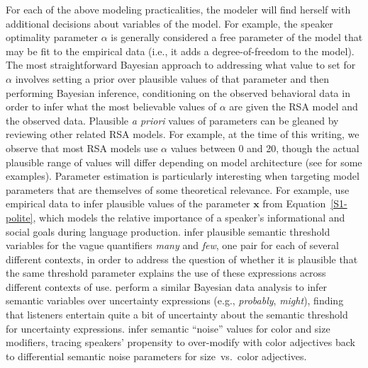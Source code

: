 \documentclass{sp}
\newcommand{\gcs}[1]{\textcolor{blue}{[gcs: #1]}}
\newcommand{\mf}[1]{\textcolor{orange}{[mf: #1]}}
\begin{document}
For each of the above modeling practicalities, the modeler will find herself with additional decisions about variables of the model. For example, the speaker optimality parameter $\alpha$ is generally considered a free parameter of the model that may be fit to the empirical data (i.e., it adds a degree-of-freedom to the model). The most straightforward Bayesian approach to addressing what value to set for $\alpha$ involves setting a prior over plausible values of that parameter and then performing Bayesian inference, conditioning on the observed behavioral data in order to infer what  the most believable values of $\alpha$ are given the RSA model and the observed data.
Plausible \emph{a priori} values of parameters can be gleaned by reviewing other related RSA models. For example, at the time of this writing, we observe that most RSA models use $\alpha$ values between 0 and 20, though the actual plausible range of values will differ depending on model architecture (see \citealp{tesslergoodman2019, yoonetal2020} for some examples).
Parameter estimation is particularly interesting when targeting model parameters that are themselves of some theoretical relevance.
For example, \citet{yoonetal2016} use empirical data to infer plausible values of the parameter $\textbf{x}$ from Equation~\eqref{S1-polite}, which models the relative importance of a speaker's informational and social goals during language production.
\citet{FrankeScholler2016:Semantic-values} infer plausible semantic threshold variables for the vague quantifiers \emph{many} and \emph{few}, one pair for each of several different contexts, in order to address the question of whether it is plausible that the same threshold parameter explains the use of these expressions across different contexts of use.
\citet{schuster2020know} perform a similar Bayesian data analysis to infer semantic variables over uncertainty expressions (e.g., \emph{probably}, \emph{might}), finding that listeners entertain quite a bit of uncertainty about the semantic threshold for uncertainty expressions. \citet{degenetal2020} infer semantic ``noise'' values for color and size modifiers, tracing speakers' propensity to over-modify with color adjectives back to differential semantic noise parameters for size~vs.~color adjectives. 
\end{document}
